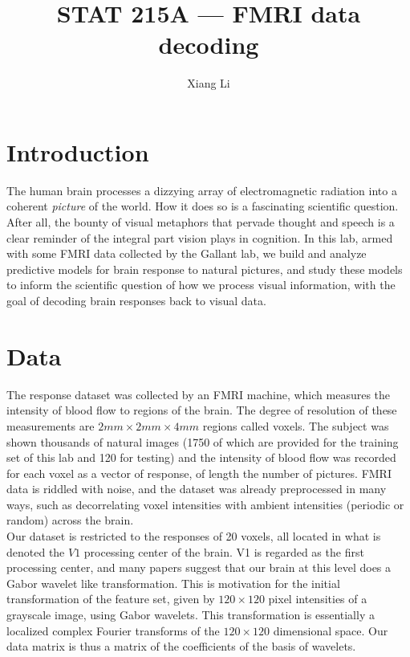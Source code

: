 \documentclass[english]{amsart}
\begin{document}
\title{STAT 215A --- FMRI data decoding}

\author{Xiang Li}

\maketitle

\section{Introduction}
The human brain processes a dizzying array of electromagnetic radiation into a coherent {\it picture} of the world. How it does so is a fascinating scientific question.  After all, the bounty of visual metaphors that pervade thought and speech is a clear reminder of the integral part vision plays in cognition.  In this lab, armed with some FMRI data collected by the Gallant lab, we build and analyze predictive models for brain response to natural pictures, and study these models to inform the scientific question of how we process visual information, with the goal of decoding brain responses back to visual data. 

\section{Data}
The response dataset was collected by an FMRI machine, which measures the intensity of blood flow to regions of the brain.  The degree of resolution of these measurements are $2mm \times 2mm \times 4mm$ regions called voxels.  The subject was shown thousands of natural images (1750 of which are provided for the training set of this lab and 120 for testing) and the intensity of blood flow was recorded for each voxel as a vector of response, of length the number of pictures.  FMRI data is riddled with noise, and the dataset was already preprocessed in many ways, such as decorrelating voxel intensities with ambient intensities (periodic or random) across the brain. \\

Our dataset is restricted to the responses of 20 voxels, all located in what is denoted the $V1$ processing center of the brain.  V1 is regarded as the first processing center, and many papers suggest that our brain at this level does a Gabor wavelet like transformation.  This is motivation for the initial transformation of the feature set, given by $120 \times 120$ pixel intensities of a grayscale image, using Gabor wavelets.  This transformation is essentially a localized complex Fourier transforms of the $120 \times 120$ dimensional space.  Our data matrix is thus a matrix of the coefficients of the basis of wavelets.
\end{document}
